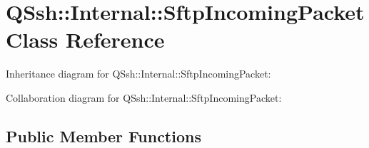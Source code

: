 \hypertarget{class_q_ssh_1_1_internal_1_1_sftp_incoming_packet}{}\section{Q\+Ssh\+:\+:Internal\+:\+:Sftp\+Incoming\+Packet Class Reference}
\label{class_q_ssh_1_1_internal_1_1_sftp_incoming_packet}


Inheritance diagram for Q\+Ssh\+:\+:Internal\+:\+:Sftp\+Incoming\+Packet\+:


Collaboration diagram for Q\+Ssh\+:\+:Internal\+:\+:Sftp\+Incoming\+Packet\+:
\subsection*{Public Member Functions}
